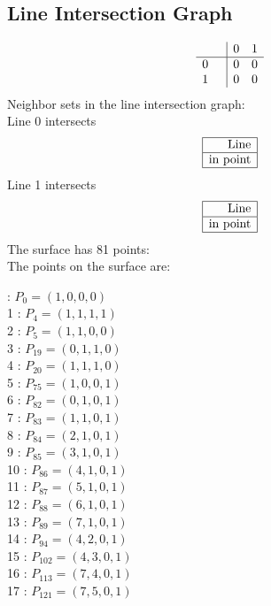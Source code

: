 \documentclass{article}
\begin{document}
{\subsection*{Line Intersection Graph}
{\arraycolsep=1pt
$$
\begin{array}{rr|*{2}r}
 &  & 0 & 1\\
\hline
0 &  & 0 & 0\\
1 &  & 0 & 0\\
\end{array}
$$
}%
Neighbor sets in the line intersection graph:\\
Line 0 intersects 
$$
\begin{array}{|r*{0}{|c}|}
\hline
\mbox{Line} \\
\hline
\mbox{in point} \\
\hline
\end{array}
$$
Line 1 intersects 
$$
\begin{array}{|r*{0}{|c}|}
\hline
\mbox{Line} \\
\hline
\mbox{in point} \\
\hline
\end{array}
$$
The surface has 81 points:\\
The points on the surface are:\\
\begin{multicols}{3}
 : $P_{0}=( 1, 0, 0, 0 )$\\
1 : $P_{4}=( 1, 1, 1, 1 )$\\
2 : $P_{5}=( 1, 1, 0, 0 )$\\
3 : $P_{19}=( 0, 1, 1, 0 )$\\
4 : $P_{20}=( 1, 1, 1, 0 )$\\
5 : $P_{75}=( 1, 0, 0, 1 )$\\
6 : $P_{82}=( 0, 1, 0, 1 )$\\
7 : $P_{83}=( 1, 1, 0, 1 )$\\
8 : $P_{84}=( 2, 1, 0, 1 )$\\
9 : $P_{85}=( 3, 1, 0, 1 )$\\
10 : $P_{86}=( 4, 1, 0, 1 )$\\
11 : $P_{87}=( 5, 1, 0, 1 )$\\
12 : $P_{88}=( 6, 1, 0, 1 )$\\
13 : $P_{89}=( 7, 1, 0, 1 )$\\
14 : $P_{94}=( 4, 2, 0, 1 )$\\
15 : $P_{102}=( 4, 3, 0, 1 )$\\
16 : $P_{113}=( 7, 4, 0, 1 )$\\
17 : $P_{121}=( 7, 5, 0, 1 )$\\

\end{multicols}}
\end{document}
